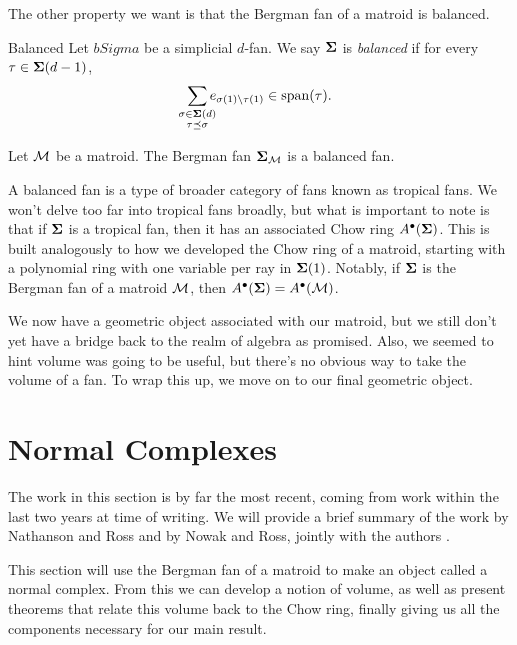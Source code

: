 \documentclass[12pt,oneside]{../../sfsuthesis}
\begin{document}
The other property we want is that the Bergman fan of a matroid is balanced.
\begin{definition}{Balanced}\th\label{def:balanced}
    Let \( bSigma \) be a simplicial \( d \)-fan.
    We say \( \bm{\Sigma} \) is \emph{balanced} if for every \( \tau \in \bm{\Sigma}(d-1) \),
    \[
        \sum_{\mathclap{\substack{\sigma \in \bSigma(d) \\ \tau \preceq \sigma}}} e_{\sigma(1) \setminus \tau(1)} \in \Span(\tau).
    \]
\end{definition}
\begin{proposition}
    Let \( \mathcal{M} \) be a matroid.
    The Bergman fan \( \bm{\Sigma}_{\mathcal{M}} \) is a balanced fan.
\end{proposition}
A balanced fan is a type of broader category of fans known as tropical fans.
We won't delve too far into tropical fans broadly, but what is important to note is that if \( \bm{\Sigma} \) is a tropical fan, then it has an associated Chow ring \( A^\bullet(\bm{\Sigma}) \).
This is built analogously to how we developed the Chow ring of a matroid,  starting with a polynomial ring with one variable per ray in \( \bm{\Sigma}(1) \).
Notably, if \( \bm{\Sigma} \) is the Bergman fan of a matroid \( \mathcal{M} \), then \( A^\bullet(\bm{\Sigma}) = A^\bullet(\mathcal{M}) \).

We now have a geometric object associated with our matroid, but we still don't yet have a bridge back to the realm of algebra as promised.
Also, we seemed to hint volume was going to be useful, but there's no obvious way to take the volume of a fan.
To wrap this up, we move on to our final geometric object.

\section{Normal Complexes}
The work in this section is by far the most recent, coming from work within the last two years at time of writing.
We will provide a brief summary of the work by Nathanson and Ross \cite{nathansonTropicalFansNormal2023} and by Nowak and Ross, jointly with the authors \cite{nowakMixedVolumesNormal2023}.

This section will use the Bergman fan of a matroid to make an object called a normal complex.
From this we can develop a notion of volume, as well as present theorems that relate this volume back to the Chow ring, finally giving us all the components necessary for our main result.
\end{document}
